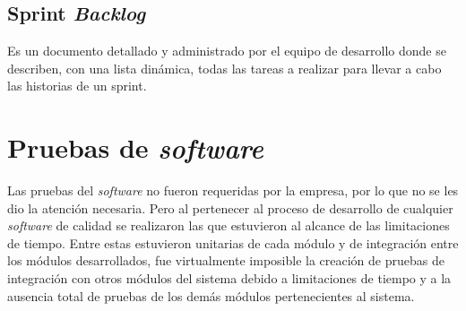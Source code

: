 \subsection{Sprint \emph{Backlog}}
Es un documento detallado y administrado por el equipo de desarrollo donde se describen, con una lista dinámica, todas las tareas a realizar para llevar a cabo las historias de un sprint.

\section{Pruebas de \emph{software}}

Las pruebas del \emph{software} no fueron requeridas por la empresa, por lo que no se les dio la atención necesaria. Pero al pertenecer al proceso de desarrollo de cualquier \emph{software} de calidad se realizaron las que estuvieron al alcance de las limitaciones de tiempo. Entre estas estuvieron unitarias de cada módulo y de integración entre los módulos desarrollados, fue virtualmente imposible la creación de pruebas de integración con otros módulos del sistema debido a limitaciones de tiempo y a la ausencia total de pruebas de los demás módulos pertenecientes al sistema.

